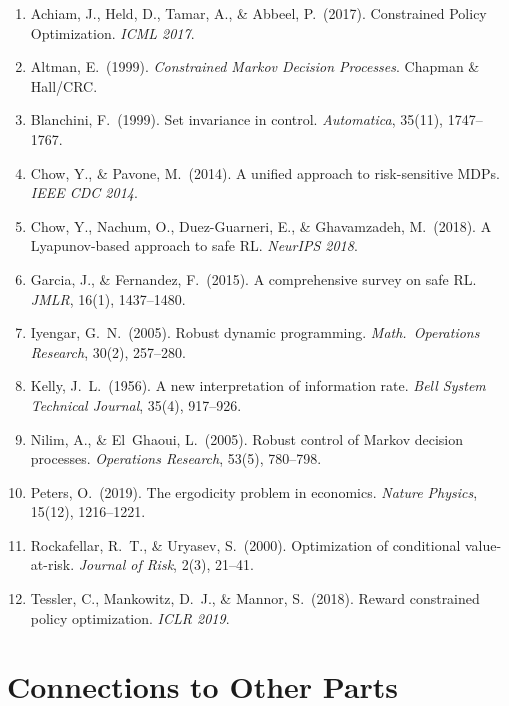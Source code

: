 \begin{enumerate}
\item Achiam, J., Held, D., Tamar, A., \& Abbeel, P.~(2017).
Constrained Policy Optimization. \textit{ICML 2017}.

\item Altman, E.~(1999). \textit{Constrained Markov Decision
Processes}. Chapman \& Hall/CRC.

\item Blanchini, F.~(1999). Set invariance in control.
\textit{Automatica}, 35(11), 1747--1767.

\item Chow, Y., \& Pavone, M.~(2014). A unified approach to
risk-sensitive MDPs. \textit{IEEE CDC 2014}.

\item Chow, Y., Nachum, O., Duez-Guarneri, E., \& Ghavamzadeh,
M.~(2018). A Lyapunov-based approach to safe RL.
\textit{NeurIPS 2018}.

\item Garcia, J., \& Fernandez, F.~(2015). A comprehensive survey on
safe RL. \textit{JMLR}, 16(1), 1437--1480.

\item Iyengar, G.~N.~(2005). Robust dynamic programming.
\textit{Math.\ Operations Research}, 30(2), 257--280.

\item Kelly, J.~L.~(1956). A new interpretation of information rate.
\textit{Bell System Technical Journal}, 35(4), 917--926.

\item Nilim, A., \& El~Ghaoui, L.~(2005). Robust control of Markov
decision processes. \textit{Operations Research}, 53(5),
780--798.

\item Peters, O.~(2019). The ergodicity problem in economics.
\textit{Nature Physics}, 15(12), 1216--1221.

\item Rockafellar, R.~T., \& Uryasev, S.~(2000). Optimization of
conditional value-at-risk. \textit{Journal of Risk}, 2(3),
21--41.

\item Tessler, C., Mankowitz, D.~J., \& Mannor, S.~(2018). Reward
constrained policy optimization. \textit{ICLR 2019}.
\end{enumerate}

\section*{Connections to Other Parts}


